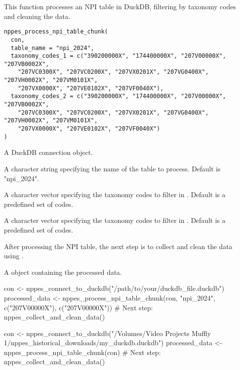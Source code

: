 \documentclass[a4paper]{book}
\begin{document}
%
\begin{Description}
This function processes an NPI table in DuckDB, filtering by taxonomy codes and cleaning the data.
\end{Description}
%
\begin{Usage}
\begin{verbatim}
nppes_process_npi_table_chunk(
  con,
  table_name = "npi_2024",
  taxonomy_codes_1 = c("390200000X", "174400000X", "207V00000X", "207VB0002X",
    "207VC0300X", "207VC0200X", "207VX0201X", "207VG0400X", "207VH0002X", "207VM0101X",
    "207VX0000X", "207VE0102X", "207VF0040X"),
  taxonomy_codes_2 = c("390200000X", "174400000X", "207V00000X", "207VB0002X",
    "207VC0300X", "207VC0200X", "207VX0201X", "207VG0400X", "207VH0002X", "207VM0101X",
    "207VX0000X", "207VE0102X", "207VF0040X")
)
\end{verbatim}
\end{Usage}
%
\begin{Arguments}
\begin{ldescription}
\item[\code{con}] A DuckDB connection object.

\item[\code{table\_name}] A character string specifying the name of the table to process. Default is "npi\_2024".

\item[\code{taxonomy\_codes\_1}] A character vector specifying the taxonomy codes to filter in . Default is a predefined set of codes.

\item[\code{taxonomy\_codes\_2}] A character vector specifying the taxonomy codes to filter in . Default is a predefined set of codes.
\end{ldescription}
\end{Arguments}
%
\begin{Details}
After processing the NPI table, the next step is to collect and clean the data using .
\end{Details}
%
\begin{Value}
A  object containing the processed data.
\end{Value}
%
\begin{Examples}
\begin{ExampleCode}
con <- nppes_connect_to_duckdb("/path/to/your/duckdb_file.duckdb")
processed_data <- nppes_process_npi_table_chunk(con, "npi_2024", c("207V00000X"), c("207V00000X"))
# Next step: nppes_collect_and_clean_data()

con <- nppes_connect_to_duckdb("/Volumes/Video Projects Muffly 1/nppes_historical_downloads/my_duckdb.duckdb")
processed_data <- nppes_process_npi_table_chunk(con)
# Next step: nppes_collect_and_clean_data()
\end{ExampleCode}
\end{Examples}
\end{document}
